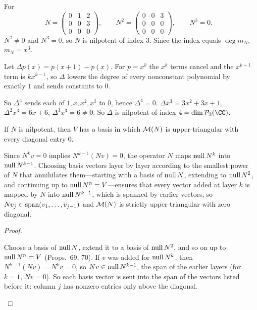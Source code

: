 \documentclass[10pt]{scrartcl}
\begin{document}
\begin{example*}
  For
  \[ N=\begin{pmatrix}0&1&2\\0&0&3\\0&0&0\end{pmatrix},\qquad N^2=\begin{pmatrix}0&0&3\\0&0&0\\0&0&0\end{pmatrix},\qquad N^3=0. \]
  $N^2\ne0$ and $N^3=0$, so $N$ is nilpotent of index $3$. Since the index equals $\deg m_N$, $m_N=x^3$.
\end{example*}

\begin{example*}
  Let $\Delta p(x)=p(x+1)-p(x)$. For $p=x^k$ the $x^k$ terms cancel and the $x^{k-1}$ term is $kx^{k-1}$, so $\Delta$ lowers the degree of every nonconstant polynomial by exactly $1$ and sends constants to $0$.
  \begin{steps}
    \ii So $\Delta^4$ sends each of $1,x,x^2,x^3$ to $0$, hence $\Delta^4=0$.
    \ii $\Delta x^3=3x^2+3x+1$, $\Delta^2x^3=6x+6$, $\Delta^3x^3=6\ne0$.
    \ii So $\Delta$ is nilpotent of index $4=\dim\PP_3(\CC)$.
  \end{steps}
\end{example*}

\begin{proposition*}\hypertarget{name-ladr-8-18-nilpotent-operators-are-strictly-upper-triangular}{}\label{name-ladr-8-18-nilpotent-operators-are-strictly-upper-triangular}
  If $N$ is nilpotent, then $V$ has a basis in which $\mathcal M(N)$ is upper-triangular with every diagonal entry $0$.
\end{proposition*}
\begin{ideabox}
Since $N^kv=0$ implies $N^{k-1}(Nv)=0$, the operator $N$ maps $\operatorname{null} N^k$ into $\operatorname{null} N^{k-1}$. Choosing basis vectors layer by layer according to the smallest power of $N$ that annihilates them---starting with a basis of $\operatorname{null} N$, extending to $\operatorname{null} N^2$, and continuing up to $\operatorname{null} N^n=V$---ensures that every vector added at layer $k$ is mapped by $N$ into $\operatorname{null} N^{k-1}$, which is spanned by earlier vectors, so $Nv_j\in\operatorname{span}(v_1,\dots,v_{j-1})$ and $\mathcal M(N)$ is strictly upper-triangular with zero diagonal.
\end{ideabox}
\begin{proof}
  \begin{steps}
    \ii Choose a basis of $\operatorname{null} N$, extend it to a basis of $\operatorname{null} N^2$, and so on up to $\operatorname{null} N^n=V$ (Props.~69, 70).
    \ii If $v$ was added for $\operatorname{null} N^k$, then $N^{k-1}(Nv)=N^kv=0$, so $Nv\in\operatorname{null} N^{k-1}$, the span of the earlier layers (for $k=1$, $Nv=0$).
    \ii So each basis vector is sent into the span of the vectors listed before it: column $j$ has nonzero entries only above the diagonal.
  \end{steps}
\end{proof}
\end{document}
